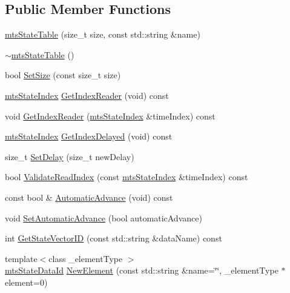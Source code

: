 \subsection*{Public Member Functions}
\begin{DoxyCompactItemize}
\item 
\hyperlink{classmts_state_table_ae954ad47082d48f3f8e714afad5a9767}{mts\+State\+Table} (size\+\_\+t size, const std\+::string \&name)
\item 
\hyperlink{classmts_state_table_a03c3835c43941a57d66505abd2f05322}{$\sim$mts\+State\+Table} ()
\item 
bool \hyperlink{classmts_state_table_a136f4ad7e8d6dfab270986ce47295fd5}{Set\+Size} (const size\+\_\+t size)
\item 
\hyperlink{classmts_state_index}{mts\+State\+Index} \hyperlink{classmts_state_table_af4901ad205b88d098b6ee97b59af16a4}{Get\+Index\+Reader} (void) const 
\item 
void \hyperlink{classmts_state_table_afa402569cbba5a992f73af46949f6b8e}{Get\+Index\+Reader} (\hyperlink{classmts_state_index}{mts\+State\+Index} \&time\+Index) const 
\item 
\hyperlink{classmts_state_index}{mts\+State\+Index} \hyperlink{classmts_state_table_a459a5d0de87163c2a165f8d6fa8c31eb}{Get\+Index\+Delayed} (void) const 
\item 
size\+\_\+t \hyperlink{classmts_state_table_a6cebcf5b3e058c869bf4b4c34f499b4b}{Set\+Delay} (size\+\_\+t new\+Delay)
\item 
bool \hyperlink{classmts_state_table_a6b92270e56f337ee1fa769ff42c5eee4}{Validate\+Read\+Index} (const \hyperlink{classmts_state_index}{mts\+State\+Index} \&time\+Index) const 
\item 
const bool \& \hyperlink{classmts_state_table_a51b9fa57c462ae00bcdaaf1c62c54607}{Automatic\+Advance} (void) const 
\item 
void \hyperlink{classmts_state_table_a3ece77254c327aabfed28607e42dc71c}{Set\+Automatic\+Advance} (bool automatic\+Advance)
\item 
int \hyperlink{classmts_state_table_a0ae9b9c0b7eab66ebfcc93550ab3f83d}{Get\+State\+Vector\+I\+D} (const std\+::string \&data\+Name) const 
\item 
{\footnotesize template$<$class \+\_\+element\+Type $>$ }\\\hyperlink{mts_state_table_8h_ac3a0e34e8991d51790b043fa01857a35}{mts\+State\+Data\+Id} \hyperlink{classmts_state_table_afb91c059336258d4d2c0093051a8a7dd}{New\+Element} (const std\+::string \&name=\char`\"{}\char`\"{}, \+\_\+element\+Type $\ast$element=0)

\end{DoxyCompactItemize}
